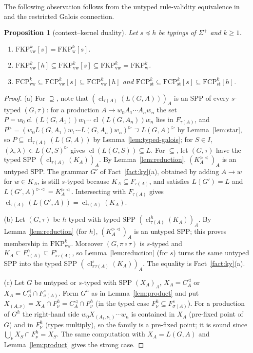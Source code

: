 \documentclass[11pt]{article}
\numberwithin{equation}{section}
\theoremstyle{plain}
\newtheorem{proposition}[theorem]{Proposition}
\theoremstyle{definition}
\theoremstyle{remark}
\theoremstyle{plain}
\newcommand{\eps}{\lambda}
\newcommand{\R}{^{\rhd}}
\newcommand{\Lc}{^{\lhd}}
\newcommand{\RL}{^{\rhd\lhd}}
\newcommand{\cl}{\operatorname{cl}}
\newcommand{\FCP}[2]{\mathrm{FCP}^{#1}_{\mathrm{#2}}}
\newcommand{\FKP}[2]{\mathrm{FKP}^{#1}_{\mathrm{#2}}}
\newcommand{\tFCP}[3]{\mathrm{FCP}^{#1}_{\mathrm{#2}}[#3]}
\newcommand{\tFKP}[3]{\mathrm{FKP}^{#1}_{\mathrm{#2}}[#3]}
\begin{document}
The following observation follows from the untyped rule-validity
equivalence in \citet[Sec.~4]{ky2017} and the restricted Galois connection.
\begin{proposition}[context--kernel duality]\label{prop:duality}
Let $s\preceq h$ be typings of $\Sigma^+$ and $k\ge1$.
\begin{enumerate}[label=\textup{(\alph*)},nosep]
\item $\tFKP{k}{vw}{s}=\tFKP{k}{w}{s}$.
\item $\tFKP{k}{vw}{h}\subseteq\tFKP{k}{vw}{s}\subseteq\FKP{k}{vw}=\FKP{k}{w}$.
\item $\FCP{k}{vw}\subseteq\tFCP{k}{vw}{s}\subseteq\tFCP{k}{vw}{h}$ and
$\FCP{k}{st}\subseteq\tFCP{k}{st}{s}\subseteq\tFCP{k}{st}{h}$.
\end{enumerate}
\end{proposition}
\begin{proof}
(a) For $\supseteq$, note that $(\cl_{\tau(A)}(L(G,A)))_A$ is an SPP of every
$s$-typed $(G,\tau)$: for a production $A\to w_0A_1\cdots A_nw_n$ the set
$P=w_0\cl(L(G,A_1))w_1\cdots\cl(L(G,A_n))w_n$ lies in $F_{\tau(A)}$, and
$P\R=(w_0L(G,A_1)w_1\cdots L(G,A_n)w_n)\R\supseteq L(G,A)\R$ by
Lemma~\ref{lem:star}, so $P\subseteq\cl_{\tau(A)}(L(G,A))$ by
Lemma~\ref{lem:typed-galois}; for $S\in I$, $(\eps,\eps)\in L(G,S)\R$ gives
$\cl(L(G,S))\subseteq L$.  For $\subseteq$, let $(G,\tau)$ have the
typed SPP $(\cl_{\tau(A)}(K_A))_A$.  By Lemma~\ref{lem:reduction},
$(K_A\RL)_A$ is an untyped SPP.  The grammar $G'$ of Fact~\ref{fact:ky}(a),
obtained by adding $A\to w$ for $w\in K_A$, is still $s$-typed because
$K_A\subseteq F_{\tau(A)}$, and satisfies $L(G')=L$ and $L(G',A)\RL=K_A\RL$.
Intersecting with $F_{\tau(A)}$ gives
$\cl_{\tau(A)}(L(G',A))=\cl_{\tau(A)}(K_A)$.

(b) Let $(G,\tau)$ be $h$-typed with typed SPP $(\cl^h_{\tau(A)}(K_A))_A$.
By Lemma~\ref{lem:reduction} (for $h$), $(K_A\RL)_A$ is an untyped SPP; this
proves membership in $\FKP{k}{vw}$.  Moreover $(G,\pi\circ\tau)$ is
$s$-typed and $K_A\subseteq F^h_{\tau(A)}\subseteq F^s_{\pi\tau(A)}$, so
Lemma~\ref{lem:reduction} (for $s$) turns the same untyped SPP into the
typed SPP $(\cl^s_{\pi\tau(A)}(K_A))_A$.  The equality is
Fact~\ref{fact:ky}(a).

(c) Let $G$ be untyped or $s$-typed with SPP $(X_A)_A$, $X_A=C_A\Lc$ or
$X_A=C_A\Lc\cap F^s_{\sigma(A)}$.  Form $G^h$ as in Lemma~\ref{lem:product}
and put $X_{(A,\nu)}=X_A\cap F^h_\nu=C_A\Lc\cap F^h_\nu$ (in the typed case
$F^h_\nu\subseteq F^s_{\sigma(A)}$).  For a production of $G^h$ the right-hand
side $w_0X_{(A_1,\nu_1)}\cdots w_n$ is contained in $X_A$ (pre-fixed point
of $G$) and in $F^h_\nu$ (types multiply), so the family is a pre-fixed
point; it is sound since $\bigcup_\nu X_S\cap F^h_\nu=X_S$.  The same
computation with $X_A=L(G,A)$ and Lemma~\ref{lem:product} gives the strong
case.
\end{proof}
\end{document}
